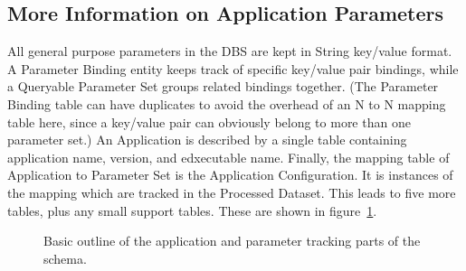 \documentclass{cmspaper}
\begin{document}
\subsection{More Information on Application Parameters}

All general purpose parameters in the DBS are kept in String key/value format.  A 
Parameter Binding entity keeps track of specific key/value pair bindings, while a 
Queryable Parameter Set groups related bindings together. (The Parameter 
Binding table can have duplicates to avoid the overhead of an N to N mapping table 
here, since a key/value pair can obviously belong to more than one parameter set.) 
An Application is described by a single table containing application name, version, 
and edxecutable name.  Finally, the mapping table of Application to Parameter Set is 
the Application Configuration.  It is instances of the mapping which are tracked 
in the Processed Dataset. This leads to five more tables, plus any small support tables.
These are shown in figure~\ref{fig:appl}.

\begin{figure}[hbtp]
  \begin{center}
    \caption{Basic outline of the application and parameter tracking parts of the schema. }
    \label{fig:appl}
  \end{center}
\end{figure}
\end{document}
